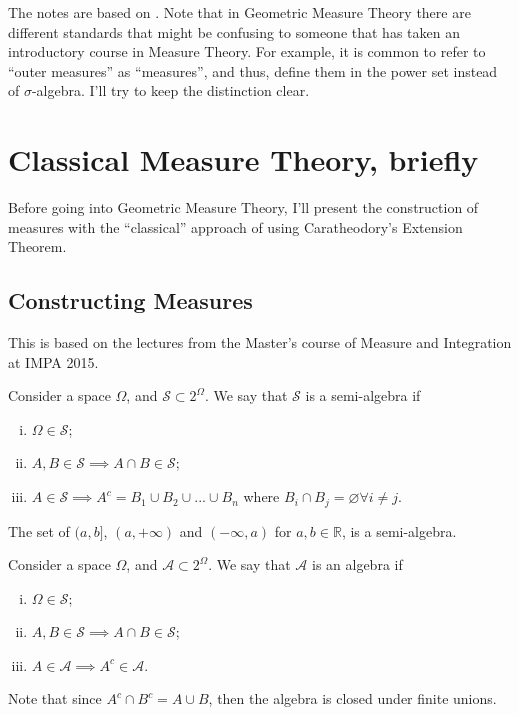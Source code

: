 The notes are based on \citet{evans2018measure}. Note that in Geometric Measure Theory
there are different standards that might be confusing to someone that has
taken an introductory course in Measure Theory.
For example, it is common to refer to ``outer measures'' as ``measures'',
and thus, define them in the power set instead of $\sigma$-algebra.
I'll try to keep the distinction clear.

\section{Classical Measure Theory, briefly}
Before going into Geometric Measure Theory, I'll present the
construction of measures with the ``classical'' approach
of using Caratheodory's Extension Theorem.

\subsection{Constructing Measures}
This is based on the lectures from the Master's course of
Measure and Integration at IMPA 2015.

\begin{definition}
	Consider a space $\Omega$, and $\mathcal S \subset 2^\Omega$.
	We say that $\mathcal S$ is a semi-algebra if
	\begin{enumerate}[(i)]
		\item $\Omega \in \mathcal S$;
		\item $A, B \in \mathcal S \implies A \cap B \in \mathcal S$;
		\item $A \in \mathcal S \implies A^c = B_1\cup B_2 \cup...\cup B_n$
		      where $B_i \cap B_j = \varnothing \forall i \neq j$.
	\end{enumerate}
\end{definition}
\begin{example}
	The set of $(a,b]$, $(a,+\infty)$ and $(-\infty,a)$ for
	$a,b \in \mathbb R$, is a semi-algebra.
\end{example}

\begin{definition}[Algebra]
	Consider a space $\Omega$, and $\mathcal A \subset 2^\Omega$.
	We say that $\mathcal A$ is an algebra if
	\begin{enumerate}[(i)]
		\item $\Omega \in \mathcal S$;
		\item $A, B \in \mathcal S \implies A \cap B \in \mathcal S$;
		\item $A \in \mathcal A \implies A^c \in \mathcal A$.
	\end{enumerate}
	Note that since $A^c \cap B^c = A \cup B$, then the
	algebra is closed under finite unions.
\end{definition}


